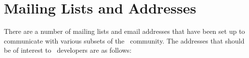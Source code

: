 
\chapter{Mailing Lists and Addresses}
\label{chap:addresses}

There are a number of mailing lists and email addresses that have been set 
up to communicate with various subsets of the \cgal\ community.  The 
addresses that should be of interest to \cgal\ developers are as follows:

